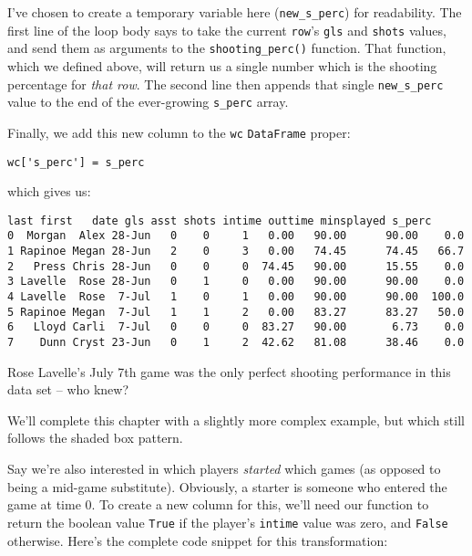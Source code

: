 I've chosen to create a temporary variable here (\texttt{new\_s\_perc}) for
readability. The first line of the loop body says to take the current
\texttt{row}'s \texttt{gls} and \texttt{shots} values, and send them as
arguments to the \texttt{shooting\_perc()} function. That function, which we
defined above, will return us a single number which is the shooting percentage
for \textit{that row}. The second line then appends that single
\texttt{new\_s\_perc} value to the end of the ever-growing \texttt{s\_perc}
array.

Finally, we add this new column to the \texttt{wc} \texttt{DataFrame} proper:

\begin{Verbatim}[fontsize=\small,samepage=true,frame=single,framesep=3mm]
wc['s_perc'] = s_perc
\end{Verbatim}

which gives us:

\begin{Verbatim}[fontsize=\scriptsize,samepage=true,frame=leftline,framesep=5mm,framerule=1mm]
     last first   date gls asst shots intime outtime minsplayed s_perc
0  Morgan  Alex 28-Jun   0    0     1   0.00   90.00      90.00    0.0
1 Rapinoe Megan 28-Jun   2    0     3   0.00   74.45      74.45   66.7
2   Press Chris 28-Jun   0    0     0  74.45   90.00      15.55    0.0
3 Lavelle  Rose 28-Jun   0    1     0   0.00   90.00      90.00    0.0
4 Lavelle  Rose  7-Jul   1    0     1   0.00   90.00      90.00  100.0
5 Rapinoe Megan  7-Jul   1    1     2   0.00   83.27      83.27   50.0
6   Lloyd Carli  7-Jul   0    0     0  83.27   90.00       6.73    0.0
7    Dunn Cryst 23-Jun   0    1     2  42.62   81.08      38.46    0.0
\end{Verbatim}

Rose Lavelle's July 7th game was the only perfect shooting performance in this
data set -- who knew?

\bigskip

We'll complete this chapter with a slightly more complex example, but which
still follows the shaded box pattern.

Say we're also interested in which players \textit{started} which games (as
opposed to being a mid-game substitute). Obviously, a starter is someone who
entered the game at time 0. To create a new column for this, we'll need our
function to return the boolean value \texttt{True} if the player's
\texttt{intime} value was zero, and \texttt{False} otherwise. Here's
the complete code snippet for this transformation:

